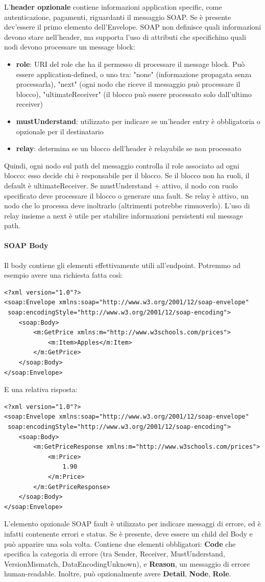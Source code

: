 \documentclass[11pt]{article}
\begin{document}
L'\textbf{header opzionale} contiene informazioni application specific, come autenticazione, pagamenti, riguardanti il messaggio SOAP. Se è presente dev'essere il primo elemento dell'Envelope. SOAP non definisce quali informazioni devono stare nell'header, ma supporta l'uso di attributi che specifichino quali nodi devono processare un message block:
\begin{itemize}
    \item \textbf{role}: URI del role che ha il permesso di processare il message block. Può essere application-defined, o uno tra: "none" (informazione propagata senza processarla), "next" (ogni nodo che riceve il messaggio può processare il blocco), "ultimateReceiver" (il blocco può essere processato solo dall'ultimo receiver)
    \item \textbf{mustUnderstand}: utilizzato per indicare se un'header entry è obbligatoria o opzionale per il destinatario
    \item \textbf{relay}: determina se un blocco dell'header è relayabile se non processato
\end{itemize}
Quindi, ogni nodo sul path del messaggio controlla il role associato ad ogni blocco: esso decide chi è responsabile per il blocco. Se il blocco non ha ruoli, il default è ultimateReceiver. Se mustUnderstand + attivo, il nodo con ruolo specificato deve processare il blocco o generare una fault. Se relay è attivo, un nodo che lo processa deve inoltrarlo (altrimenti potrebbe rimuoverlo). L'uso di relay insieme a next è utile per stabilire informazioni persistenti sul message path. 
\paragraph{SOAP Body} Il body contiene gli elementi effettivamente utili all'endpoint. Potremmo ad esempio avere una richiesta fatta così:
\begin{verbatim}
<?xml version="1.0"?>
<soap:Envelope xmlns:soap="http://www.w3.org/2001/12/soap-envelope" 
 soap:encodingStyle="http://www.w3.org/2001/12/soap-encoding">
    <soap:Body>
        <m:GetPrice xmlns:m="http://www.w3schools.com/prices">
            <m:Item>Apples</m:Item>
        </m:GetPrice>
    </soap:Body>
</soap:Envelope>
\end{verbatim}
E una relativa risposta:
\begin{verbatim}
<?xml version="1.0"?>
<soap:Envelope xmlns:soap="http://www.w3.org/2001/12/soap-envelope" 
 soap:encodingStyle="http://www.w3.org/2001/12/soap-encoding">
    <soap:Body>
        <m:GetPriceResponse xmlns:m="http://www.w3schools.com/prices">
            <m:Price>
                1.90
            </m:Price> 
        </m:GetPriceResponse>
    </soap:Body>
</soap:Envelope>
\end{verbatim}
L'elemento opzionale SOAP fault è utilizzato per indicare messaggi di errore, ed è infatti contenente errori e status. Se è presente, deve essere un child del Body e può apparire una sola volta. Contiene due elementi obbligatori: \textbf{Code} che specifica la categoria di errore (tra Sender, Receiver, MustUnderstand, VersionMismatch, DataEncodingUnknown), e \textbf{Reason}, un messaggio di errore human-readable. Inoltre, può opzionalmente avere \textbf{Detail}, \textbf{Node}, \textbf{Role}.
\end{document}
